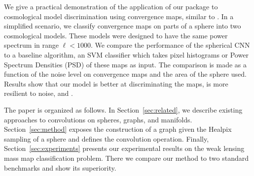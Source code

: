 \documentclass[final,twocolumn,3p,times,authoryear]{elsarticle}
\newcommand{\nati}[1]{{\color[rgb]{.1,.6,.1}{#1}}}
\newcommand{\todo}[1]{{\color[rgb]{.6,.1,.6}{#1}}}
\newcommand{\secref}[1]{Section~\ref{sec:#1}}
\newcommand{\1}{\b{1}}              %
\newcommand{\0}{\b{0}}              %
\begin{document}

We give a practical demonstration of the application of our package to cosmological model discrimination using convergence maps, similar to \citep{schmelze2017cosmologicalmodel}.
In a simplified scenario, we classify convergence maps on parts of a sphere into two cosmological models.
These models were designed to have the same power spectrum in range $\ell < 1000$.
We compare the performance of the spherical CNN to a baseline algorithm, an SVM classifier which takes pixel histograms or Power Spectrum Densities (PSD) of these maps as input.
The comparison is made as a function of the noise level on convergence maps and the area of the sphere used. Results show that our model is better at discriminating the maps, is more resilient to noise, and \todo{is faster?}.
\nati{I do not think we should argue for speed gain in this paper. We are probably much more efficient than scnns with the convolution done in the spectral domain. However compared to tradiational methods, we are in most of the cases slower.}


The paper is organized as follows.
In \secref{related}, we describe existing approaches to convolutions on spheres, graphs, and manifolds.
\secref{method} exposes the construction of a graph given the Healpix sampling of a sphere and defines the convolution operation.
Finally, \secref{experiments} presents our experimental results on the weak lensing mass map classification problem. There we compare our method to two standard benchmarks and show its superiority.

\end{document}
